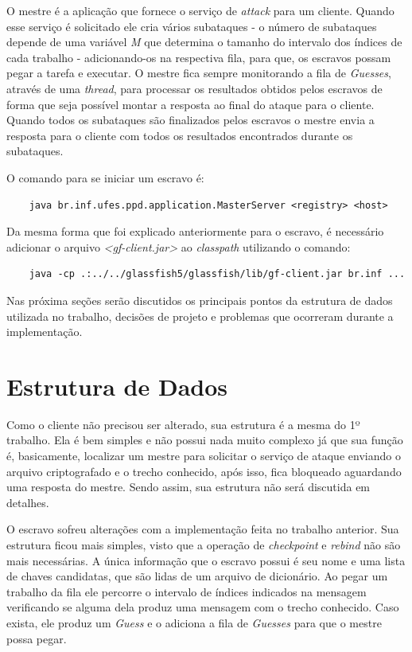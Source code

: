 \documentclass[
	12pt,				%
    oneside,			%
	a4paper,			%
	english,			%
	brazil,				%
	]{abntex2}
\begin{document}
O mestre é a aplicação que fornece o serviço de \textit{attack} para um cliente. Quando esse serviço é solicitado
ele cria vários subataques - o número de subataques depende de uma variável \textit{M} que determina o tamanho do intervalo dos índices de cada trabalho - adicionando-os na respectiva fila, para que, os escravos possam pegar a tarefa e executar.
O mestre fica sempre monitorando a fila de \textit{Guesses}, através de uma \textit{thread}, para processar os resultados obtidos pelos escravos de forma que seja possível montar a resposta ao final do ataque para o cliente.
Quando todos os subataques são finalizados pelos escravos o mestre envia a resposta para o cliente com todos os resultados encontrados durante os subataques.

O comando para se iniciar um escravo é:

\begin{lstlisting}
	java br.inf.ufes.ppd.application.MasterServer <registry> <host>
\end{lstlisting}

Da mesma forma que foi explicado anteriormente para o escravo, é necessário adicionar o arquivo \textit{<gf-client.jar>} ao \textit{classpath} utilizando o comando:

\begin{lstlisting}
	java -cp .:../../glassfish5/glassfish/lib/gf-client.jar br.inf ...
\end{lstlisting}

Nas próxima seções serão discutidos os principais pontos da estrutura de dados utilizada no trabalho, decisões de projeto e 
problemas que ocorreram durante a implementação.

\section{Estrutura de Dados}

Como o cliente não precisou ser alterado, sua estrutura é a mesma do 1º trabalho. Ela é bem simples e não possui nada muito complexo já que sua função é, basicamente, localizar um mestre para solicitar o serviço de ataque enviando o arquivo criptografado e o trecho conhecido, após isso, fica bloqueado aguardando uma resposta do mestre. Sendo assim, sua estrutura não será discutida em detalhes.

O escravo sofreu alterações com a implementação feita no trabalho anterior. Sua estrutura ficou mais simples, visto que a operação de \textit{checkpoint} e \textit{rebind} não são mais necessárias. A única informação que o escravo possui é seu nome  e uma lista de chaves candidatas, que são lidas de um arquivo de dicionário. Ao pegar um trabalho da fila ele percorre o intervalo de índices indicados na mensagem verificando se alguma dela produz uma mensagem com o trecho conhecido. Caso exista, ele produz um \textit{Guess} e o adiciona a fila de \textit{Guesses} para que o mestre possa pegar.
\end{document}
